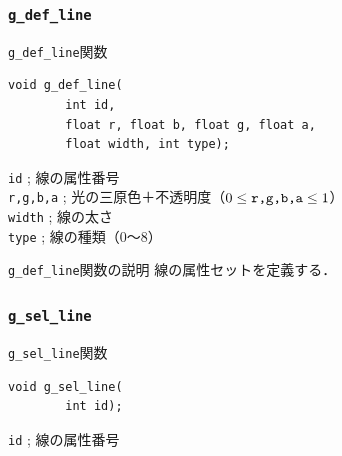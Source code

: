 \documentclass[a4paper,12pt]{jsarticle}%
\begin{document}
\clearpage
\subsubsection{\texttt{g\_def\_line}}

\begin{itembox}[l]{\texttt{g\_def\_line}関数}
\begin{verbatim}
void g_def_line(
        int id,	
        float r, float b, float g, float a,
        float width, int type);
\end{verbatim}
\verb|id| ; 線の属性番号\\
\verb|r,g,b,a| ; 光の三原色＋不透明度（$0\leq \verb|r,g,b,a| \leq 1$）\\
\verb|width| ; 線の太さ\\
\verb|type| ; 線の種類（0〜8）\\
\end{itembox}

\begin{itembox}[l]{\texttt{g\_def\_line}関数の説明}
線の属性セットを定義する．
\end{itembox}

\begin{figure}[htb]
\end{figure}



\clearpage
\subsubsection{\texttt{g\_sel\_line}}

\begin{itembox}[l]{\texttt{g\_sel\_line}関数}
\begin{verbatim}
void g_sel_line(
        int id);
\end{verbatim}
\verb|id| ; 線の属性番号\\
\end{itembox}
\end{document}
